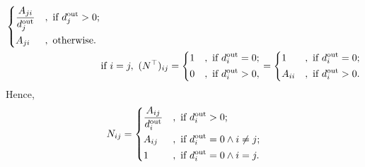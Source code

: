 \begin{enumerate}[(a)]
\[\begin{alignedat}{3}
\begin{dcases}
				      \frac{A_{ji}}{d_{j}^{\text{out}}} & , \text{ if }d_{j}^{\text{out}}>0; \\
				      A_{ji}                            & , \text{ otherwise}.               \\
			      \end{dcases}\\
			      &\text{if }i = j,\ (N^{\top})_{ij} = \begin{dcases}
				      1 & , \text{ if } d_{i}^{\text{out}} = 0; \\
				      0 & , \text{ if } d_{i}^{\text{out}} > 0, \\
			      \end{dcases} &&= \begin{dcases}
				      1      & , \text{ if } d_{i}^{\text{out}} = 0; \\
				      A_{ii} & , \text{ if } d_{i}^{\text{out}} > 0. \\
			      \end{dcases}
		      \end{alignedat}
	      \]
	      Hence,
	      \[
		      N_{ij} = \begin{dcases}
			      \frac{A_{ij}}{d_{i}^{\text{out}}} & , \text{ if } d_{i}^{\text{out}} > 0;              \\
			      A_{ij}                            & , \text{ if }d_{i}^{\text{out}} = 0 \land i\neq j; \\
			      1                                 & , \text{ if }d_{i}^{\text{out}} = 0 \land i= j.    \\
		      \end{dcases}
	      \]
\end{enumerate}

